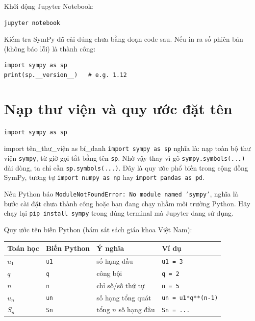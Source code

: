 \documentclass[12pt,a4paper]{report}
\newcommand{\pycmd}[1]{\texttt{\color{kw}#1}}
\begin{document}
Khởi động Jupyter Notebook:

\begin{lstlisting}[language=bash,numbers=none]
jupyter notebook
\end{lstlisting}

\begin{tipbox}
Kiểm tra SymPy đã cài đúng chưa bằng đoạn code sau. Nếu in ra số phiên
bản (không báo lỗi) là thành công:

\begin{lstlisting}
import sympy as sp
print(sp.__version__)   # e.g. 1.12
\end{lstlisting}
\end{tipbox}

\section{Nạp thư viện và quy ước đặt tên}

\begin{lstlisting}
import sympy as sp
\end{lstlisting}

\begin{syntaxbox}{import tên\_thư\_viện as bí\_danh}
\pycmd{import sympy as sp} nghĩa là: nạp toàn bộ thư viện
\texttt{sympy}, từ giờ gọi tắt bằng tên \texttt{sp}. Nhờ vậy thay vì gõ
\texttt{sympy.symbols(...)} dài dòng, ta chỉ cần
\texttt{sp.symbols(...)}. Đây là quy ước phổ biến trong cộng đồng
SymPy, tương tự \texttt{import numpy as np} hay
\texttt{import pandas as pd}.
\end{syntaxbox}

\begin{warnbox}
Nếu Python báo \texttt{ModuleNotFoundError: No module named 'sympy'},
nghĩa là bước cài đặt chưa thành công hoặc bạn đang chạy nhầm môi
trường Python. Hãy chạy lại \texttt{pip install sympy} trong đúng
terminal mà Jupyter đang sử dụng.
\end{warnbox}

Quy ước tên biến Python (bám sát sách giáo khoa Việt Nam):

\begin{center}
\begin{tabular}{@{}llll@{}}
\toprule
\textbf{Toán học} & \textbf{Biến Python} & \textbf{Ý nghĩa} & \textbf{Ví dụ}\\
\midrule
$u_1$ & \texttt{u1} & số hạng đầu & \texttt{u1 = 3}\\
$q$ & \texttt{q} & công bội & \texttt{q = 2}\\
$n$ & \texttt{n} & chỉ số/số thứ tự & \texttt{n = 5}\\
$u_n$ & \texttt{un} & số hạng tổng quát & \texttt{un = u1*q**(n-1)}\\
$S_n$ & \texttt{Sn} & tổng $n$ số hạng đầu & \texttt{Sn = ...}\\
\bottomrule
\end{tabular}
\end{center}
\end{document}
